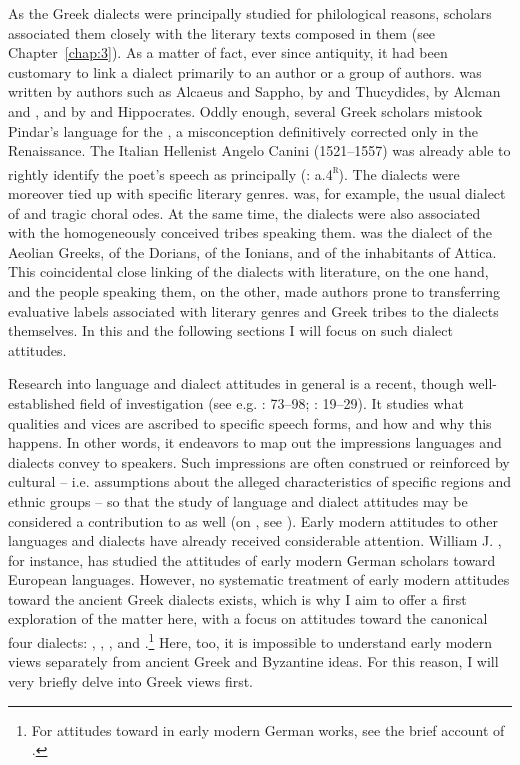 As the Greek dialects were principally studied for philological reasons, scholars associated them closely with the literary texts composed in them (see Chapter~\ref{chap:3}). As a matter of fact, ever since antiquity, it had been customary to link a dialect primarily to an author or a group of authors.  was written by authors such as Alcaeus and Sappho,  by  and Thucydides,  by Alcman and , and  by  and Hippocrates. Oddly enough, several Greek scholars mistook Pindar’s language for the , a misconception definitively corrected only in the Renaissance. The Italian Hellenist Angelo Canini (1521–1557) was already able to rightly identify the poet’s speech as principally  (\citealt{Canini1555}: a.4\textsc{\textsuperscript{r}}). The dialects were moreover tied up with specific literary genres.  was, for example, the usual dialect of  and tragic choral odes. At the same time, the dialects were also associated with the homogeneously conceived tribes speaking them.  was the dialect of the Aeolian Greeks,  of the Dorians,  of the Ionians, and  of the inhabitants of Attica. This coincidental close linking of the dialects with literature, on the one hand, and the people speaking them, on the other, made authors prone to transferring evaluative labels associated with literary genres and Greek tribes to the dialects themselves. In this and the following sections I will focus on such dialect attitudes.

Research into language and dialect attitudes in general is a recent, though well-established field of investigation (see e.g. \citealt{Edwards2009}: 73–98; \citealt{Garrett2010}: 19–29). It studies what qualities and vices are ascribed to specific speech forms, and how and why this happens. In other words, it endeavors to map out the impressions languages and dialects convey to speakers. Such impressions are often construed or reinforced by cultural  – i.e. assumptions about the alleged characteristics of specific regions and ethnic groups – so that the study of language and dialect attitudes may be considered a contribution to  as well (on , see \citealt{BellerLeerssen2007}). Early modern attitudes to other languages and dialects have already received considerable attention. William J. \citet{Jones1999}, for instance, has studied the attitudes of early modern German scholars toward European languages. However, no systematic treatment of early modern attitudes toward the ancient Greek dialects exists, which is why I aim to offer a first exploration of the matter here, with a focus on attitudes toward the canonical four dialects: , , , and .\footnote{For attitudes toward  in early modern German works, see the brief account of \citet[251--252]{Roelcke2014}.} Here, too, it is impossible to understand early modern views separately from ancient Greek and Byzantine ideas. For this reason, I will very briefly delve into Greek views first.

